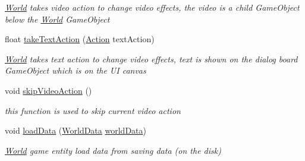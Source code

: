 \begin{DoxyCompactItemize}
\begin{DoxyCompactList}\small\item\em \hyperlink{class_world}{World} takes video action to change video effects, the video is a child Game\+Object below the \hyperlink{class_world}{World} Game\+Object \end{DoxyCompactList}\item 
float \hyperlink{class_world_ab411c201ddaf53d109dd5758fa2331f4}{take\+Text\+Action} (\hyperlink{classdoki_script_setting_1_1_action}{Action} text\+Action)
\begin{DoxyCompactList}\small\item\em \hyperlink{class_world}{World} takes text action to change video effects, text is shown on the dialog board Game\+Object which is on the UI canvas \end{DoxyCompactList}\item 
void \hyperlink{class_world_a12235f6de623f070fa9947b51fda8f7b}{skip\+Video\+Action} ()
\begin{DoxyCompactList}\small\item\em this function is used to skip current video action \end{DoxyCompactList}\item 
void \hyperlink{class_world_a57146d033c4fca110b6bc6174e8fded4}{load\+Data} (\hyperlink{class_world_data}{World\+Data} \hyperlink{class_world_a1fbe122911090d8260c2adb3154948e9}{world\+Data})
\begin{DoxyCompactList}\small\item\em \hyperlink{class_world}{World} game entity load data from saving data (on the disk) \end{DoxyCompactList}\end{DoxyCompactItemize}
